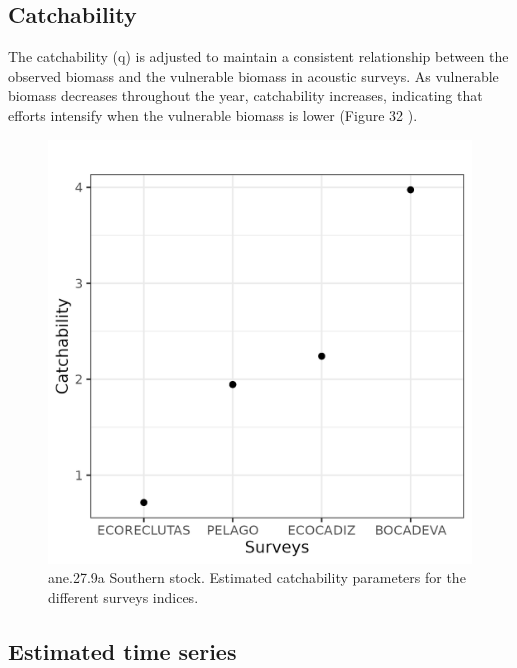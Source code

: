 \documentclass[
]{article}
\begin{document}
\hypertarget{catchability-1}{%
\subsection{Catchability}\label{catchability-1}}

The catchability (q) is adjusted to maintain a consistent relationship
between the observed biomass and the vulnerable biomass in acoustic
surveys. As vulnerable biomass decreases throughout the year,
catchability increases, indicating that efforts intensify when the
vulnerable biomass is lower (Figure 32 ).

\begin{figure}[H]

{\centering \includegraphics[width=0.95\linewidth]{report/run/S1.0_4FLEETS_SelECO_RecIndex_Mnewfix/fig_catchability} 

}

\caption{ane.27.9a Southern stock. Estimated catchability parameters for the different surveys indices.}\label{fig:unnamed-chunk-38}
\end{figure}

\hypertarget{estimated-time-series}{%
\subsection{Estimated time series}\label{estimated-time-series}}
\end{document}
